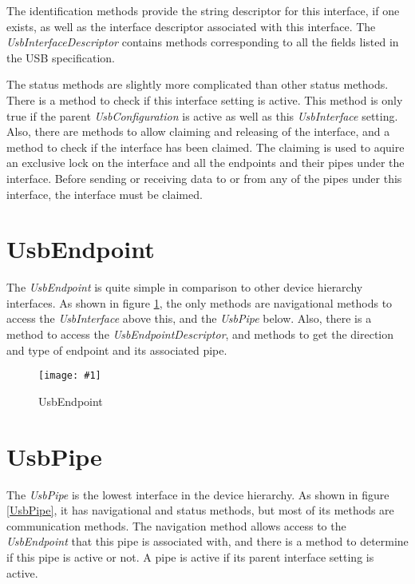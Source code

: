 \documentclass{article}
\newcommand{\myinterface}[1]{\emph{#1}}
\newcommand{\mysectionend}[0]{\vfill\pagebreak[1]}
\newcommand{\myfigure}[3]{\begin{figure}[htbp]\centering\texttt{[image: \#1]}\caption{#2}\label{#3}\end{figure}}
\begin{document}
The identification methods provide the string descriptor for this interface,
if one exists, as well as the interface descriptor associated with this interface.
The \myinterface{UsbInterfaceDescriptor} contains methods corresponding to all the fields
listed in the USB specification.

The status methods are slightly more complicated than other status methods.
There is a method to check if this interface setting is active.  This
method is only true if the parent \myinterface{UsbConfiguration} is active as well as
this \myinterface{UsbInterface} setting.  Also, there are methods to allow claiming
and releasing of the interface, and a method to check if the interface
has been claimed.  The claiming is used to aquire an exclusive lock
on the interface and all the endpoints and their pipes under the interface.
Before sending or receiving data to or from any of the pipes under
this interface, the interface must be claimed.

\mysectionend

%

\section{UsbEndpoint}

The \myinterface{UsbEndpoint} is quite simple in comparison to other device hierarchy
interfaces.  As shown in figure \ref{UsbEndpoint}, the only methods are
navigational methods to access the \myinterface{UsbInterface} above this, and the
\myinterface{UsbPipe} below.  Also, there is a method to access the \myinterface{UsbEndpointDescriptor},
and methods to get the direction and type of endpoint and its associated
pipe.

\myfigure{figs/UsbEndpoint}{UsbEndpoint}{UsbEndpoint}

\mysectionend

%

\section{UsbPipe}

The \myinterface{UsbPipe} is the lowest interface in the device hierarchy.  As shown in
figure \ref{UsbPipe}, it has navigational and status methods, but most of
its methods are communication methods.  The navigation method allows
access to the \myinterface{UsbEndpoint} that this pipe is associated with, and there
is a method to determine if this pipe is active or not.  A pipe is
active if its parent interface setting is active.
\end{document}

